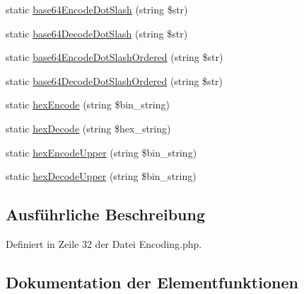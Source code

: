 \begin{DoxyCompactItemize}
\item 
static \mbox{\hyperlink{class_paragon_i_e_1_1_constant_time_1_1_encoding_adf2907797342312e2ba7c3c28961224e}{base64\+Encode\+Dot\+Slash}} (string \$str)
\item 
static \mbox{\hyperlink{class_paragon_i_e_1_1_constant_time_1_1_encoding_a83ca331a2527e9e4b62688e7c014f672}{base64\+Decode\+Dot\+Slash}} (string \$str)
\item 
static \mbox{\hyperlink{class_paragon_i_e_1_1_constant_time_1_1_encoding_ad599f60d4017933c637031eabd2296bc}{base64\+Encode\+Dot\+Slash\+Ordered}} (string \$str)
\item 
static \mbox{\hyperlink{class_paragon_i_e_1_1_constant_time_1_1_encoding_af7d9eaa932d09feb5ff379e9bf233c92}{base64\+Decode\+Dot\+Slash\+Ordered}} (string \$str)
\item 
static \mbox{\hyperlink{class_paragon_i_e_1_1_constant_time_1_1_encoding_a19f0079c6c48e36314f1bf21cd61a88f}{hex\+Encode}} (string \$bin\+\_\+string)
\item 
static \mbox{\hyperlink{class_paragon_i_e_1_1_constant_time_1_1_encoding_af6cf7e27c63b8c2241b05c21f3ce13bf}{hex\+Decode}} (string \$hex\+\_\+string)
\item 
static \mbox{\hyperlink{class_paragon_i_e_1_1_constant_time_1_1_encoding_aebea6f77ab5be7a3650d32a0aff047dd}{hex\+Encode\+Upper}} (string \$bin\+\_\+string)
\item 
static \mbox{\hyperlink{class_paragon_i_e_1_1_constant_time_1_1_encoding_a05066d0c8012086b6c7d4c81b74a146e}{hex\+Decode\+Upper}} (string \$bin\+\_\+string)
\end{DoxyCompactItemize}


\subsection{Ausführliche Beschreibung}


Definiert in Zeile 32 der Datei Encoding.\+php.



\subsection{Dokumentation der Elementfunktionen}
\mbox{\label{class_paragon_i_e_1_1_constant_time_1_1_encoding_ab15e07a5e22dd3fd99807afccbe54d4d}} 

